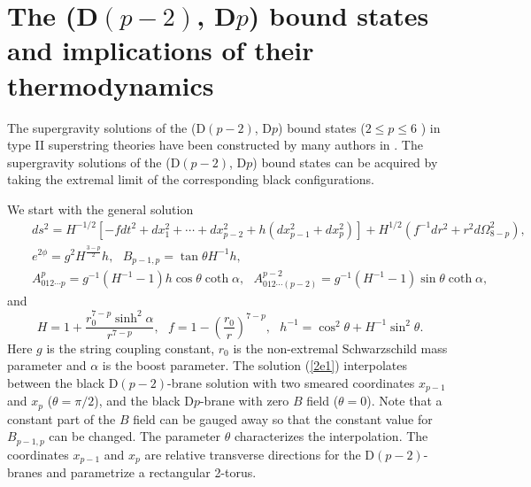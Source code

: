 \documentclass[a4paper,12pt]{article}
\newcommand{\sect}[1]{\setcounter{equation}{0}\section{#1}}
\begin{document}
\sect{The (D$(p-2)$, D$p$) bound states and implications
 of their thermodynamics }

The supergravity solutions of the (D$(p-2)$, D$p$) bound states
($2 \le p \le 6$ ) in type II superstring theories have been constructed
by many authors in \cite{Russo,Breck,Mig,Roy,Harmark}. The supergravity
solutions of the (D$(p-2)$, D$p$) bound states can be acquired by taking
the extremal limit of the corresponding black configurations.

We start with the general solution
\begin{eqnarray}
&& ds^2 = H^{-1/2}[-f dt^2 +dx_1^2 +\cdots +dx_{p-2}^2 +h(dx_{p-1}^2 +dx_p^2)]
 +H^{1/2}(f^{-1}dr^2 +r^2 d\Omega_{8-p}^2), \nonumber\\
&& e^{2\phi} = g^2 H^{\frac{3-p}{2}}h, \ \ \ B_{p-1,p}=\tan\theta H^{-1}h,
 \nonumber\\
\label{2e1}
&& A^{p}_{012\cdots p} = g^{-1}(H^{-1}-1)h\cos\theta \coth\alpha,\ \ \
 A^{p-2}_{012\cdots (p-2)}=g^{-1}(H^{-1}-1)\sin\theta \coth\alpha,
\end{eqnarray}
and
\begin{equation}
\label{2e2}
H=1+\frac{r_0^{7-p}\sinh^2\alpha}{r^{7-p}}, \ \ \ f=1-\left(\frac{r_0}
 {r}\right)^{7-p}, \ \ \ h^{-1}=\cos^2\theta +H^{-1}\sin^2\theta.
\end{equation}
Here $g$ is the string coupling constant, $r_0$ is the non-extremal
Schwarzschild mass parameter and $\alpha $ is the boost parameter. The
solution (\ref{2e1}) interpolates between the black D$(p-2)$-brane solution
with two smeared coordinates $x_{p-1}$ and $x_p$ ($\theta=\pi/2$), and
the black D$p$-brane with zero $B$ field ($\theta=0$).
Note that a constant part of the $B$ field can be gauged away so that the
constant value for $B_{p-1,p}$ can be changed. The parameter
$\theta$ characterizes the interpolation. The coordinates $x_{p-1}$ and $x_p$
are relative transverse directions for the D$(p-2)$-branes and parametrize
a rectangular 2-torus.
\end{document}
